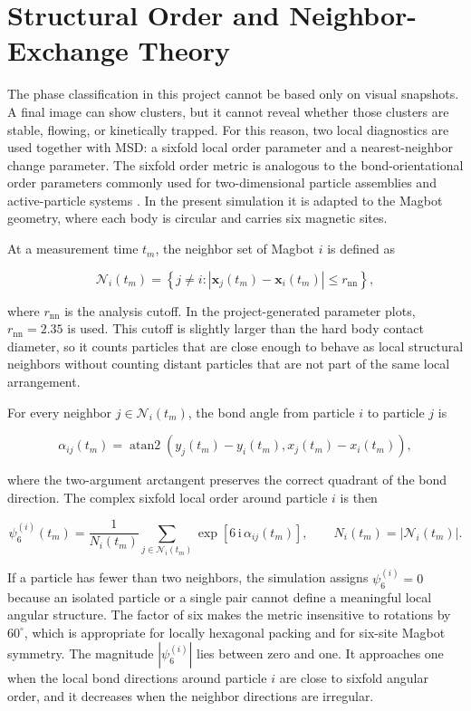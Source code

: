 \documentclass[12pt,a4paper,oneside]{report}
\begin{document}
\section{Structural Order and Neighbor-Exchange Theory}
The phase classification in this project cannot be based only on visual snapshots. A final image can show clusters, but it cannot reveal whether those clusters are stable, flowing, or kinetically trapped. For this reason, two local diagnostics are used together with MSD: a sixfold local order parameter and a nearest-neighbor change parameter. The sixfold order metric is analogous to the bond-orientational order parameters commonly used for two-dimensional particle assemblies and active-particle systems \cite{bechinger2016active}. In the present simulation it is adapted to the Magbot geometry, where each body is circular and carries six magnetic sites.

At a measurement time $t_m$, the neighbor set of Magbot $i$ is defined as

\begin{equation}
\mathcal{N}_i(t_m)=
\left\{
j\ne i:
\left|\mathbf{x}_j(t_m)-\mathbf{x}_i(t_m)\right|
\le r_{\mathrm{nn}}
\right\},
\end{equation}

where $r_{\mathrm{nn}}$ is the analysis cutoff. In the project-generated parameter plots, $r_{\mathrm{nn}}=2.35$ is used. This cutoff is slightly larger than the hard body contact diameter, so it counts particles that are close enough to behave as local structural neighbors without counting distant particles that are not part of the same local arrangement.

For every neighbor $j\in\mathcal{N}_i(t_m)$, the bond angle from particle $i$ to particle $j$ is

\begin{equation}
\alpha_{ij}(t_m)=
\operatorname{atan2}
\left(
y_j(t_m)-y_i(t_m),
x_j(t_m)-x_i(t_m)
\right),
\end{equation}

where the two-argument arctangent preserves the correct quadrant of the bond direction. The complex sixfold local order around particle $i$ is then

\begin{equation}
\psi_6^{(i)}(t_m)=
\frac{1}{N_i(t_m)}
\sum_{j\in\mathcal{N}_i(t_m)}
\exp\!\left[6\,\mathrm{i}\,\alpha_{ij}(t_m)\right],
\qquad
N_i(t_m)=|\mathcal{N}_i(t_m)|.
\end{equation}

If a particle has fewer than two neighbors, the simulation assigns $\psi_6^{(i)}=0$ because an isolated particle or a single pair cannot define a meaningful local angular structure. The factor of six makes the metric insensitive to rotations by $60^\circ$, which is appropriate for locally hexagonal packing and for six-site Magbot symmetry. The magnitude $|\psi_6^{(i)}|$ lies between zero and one. It approaches one when the local bond directions around particle $i$ are close to sixfold angular order, and it decreases when the neighbor directions are irregular.
\end{document}
